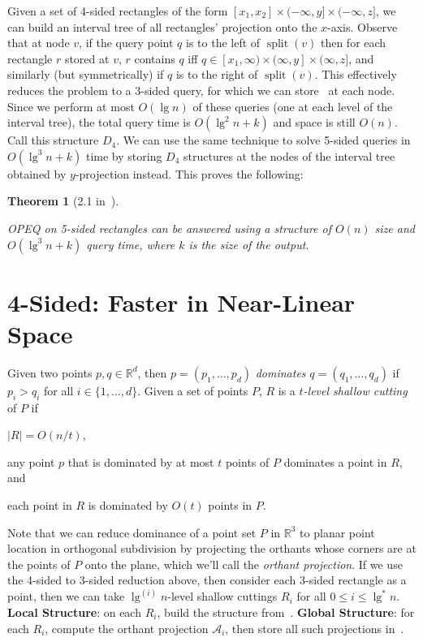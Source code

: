\documentclass[letterpaper,12pt,twocolumn]{article}
\DeclareMathOperator{\splt}{split}
\newcommand{\BigOh}[1]{O\!\left(#1\right)}
\newcommand\IR{\mathbb{R}}
\newcommand\D[1]{$D_{#1}$}
\newcommand\bounds[1]{[#1]}
\newcommand\lbounds[1]{(#1]} %
\newcommand\rbounds[1]{[#1)} %
\theoremstyle{plain}
\newtheorem{theorem}{Theorem}
\begin{document}
Given a set of 4-sided rectangles of the form $\bounds{x_1,x_2} \times
\lbounds{-\infty, y} \times \lbounds{-\infty,z}$, we can build an
interval tree of all rectangles' projection onto the $x$-axis.
Observe that at node $v$, if the query point $q$ is to the left of
$\splt(v)$ then for each rectangle $r$ stored at $v$, $r$ contains $q$
iff $q \in \rbounds{x_1, \infty} \times \lbounds{\infty, y} \times
\lbounds{\infty, z}$, and similarly (but symmetrically) if $q$ is to
the right of $\splt(v)$.  This effectively reduces the problem to a
3-sided query, for which we can store~\cite{afshani2008dominance} at
each node.  Since we perform at most $\BigOh{\lg n}$ of these queries
(one at each level of the interval tree), the total query time is
$\BigOh{\lg^2 n + k}$ and space is still $\BigOh{n}$.  Call this
structure \D{4}.  We can use the same technique to solve 5-sided
queries in $\BigOh{\lg^3 n + k}$ time by storing \D{4} structures at
the nodes of the interval tree obtained by $y$-projection instead.
This proves the following:

\begin{theorem}[2.1 in~\cite{saladi2015improved}]\label{thm:21}

  OPEQ on 5-sided rectangles can be answered using a structure of
  $\BigOh{n}$ size and $\BigOh{\lg^3 n + k}$ query time, where $k$
  is the size of the output.

\end{theorem}

\section{4-Sided: Faster in Near-Linear Space}

Given two points $p,q \in \IR^d$, then $p = (p_1, \ldots, p_d)$
\emph{dominates} $q = (q_1, \ldots, q_d)$ if $p_i > q_i$ for all $i
\in \{1, \ldots, d \}$.  Given a set of points $P$, $R$ is a
\emph{$t$-level shallow cutting} of $P$ if
%
\begin{enumerate*}[label=(\roman*)] %
\item $|R| = \BigOh{n/t}$,
\item any point $p$ that is dominated by at most $t$ points of $P$
  dominates a point in $R$, and
\item each point in $R$ is dominated by $\BigOh{t}$ points in $P$.
\end{enumerate*}

Note that we can reduce dominance of a point set $P$ in $\IR^3$ to
planar point location in orthogonal subdivision by projecting the
orthants whose corners are at the points of $P$ onto the plane, which
we'll call the \emph{orthant projection}.  If we use the 4-sided to
3-sided reduction above, then consider each 3-sided rectangle as a
point, then we can take $\lg^{(i)} n$-level shallow cuttings $R_i$ for
all $0 \le i \le \lg^* n$.  \textbf{Local Structure}: on each $R_i$,
build the structure from~\cite{afshani2008dominance}.  \textbf{Global
  Structure}: for each $R_i$, compute the orthant projection
$\mathcal{A}_i$, then store all such projections
in~\cite{chazelle1986filtering}.
\end{document}

